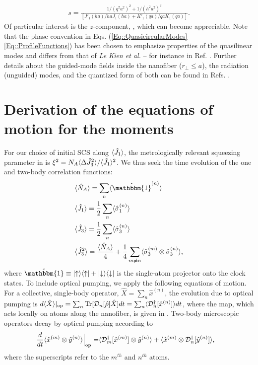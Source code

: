 \documentclass[preprint, aps,pra,onecolumn]{revtex4-1} %
\newcommand{\jx}{\hat{J}_1}
\begin{document}
\begin{appendix}
	\begin{align}
		s = \frac{1/(q^2 a^2)^{2} + 1/(h^2 a^2)^{2}}{[J'_1(ha)/haJ_1(ha) + K'_1(qa)/qaK_1(qa)]}.
	\end{align}  
Of particular interest is the $z$-component, , which can become appreciable.  Note that the phase convention in Eqs. (\ref{Eq::QuasicircularModes}-\ref{Eq::ProfileFunctions}) has been chosen to emphasize properties of the quasilinear modes and differs from that of \emph{Le Kien et al.} -- for instance in Ref. \cite{le_kien_propagation_2014}.  
Further details about the guided-mode fields inside the nanofiber ($r_\perp\leq a$), the radiation (unguided) modes, and the quantized form of both can be found in Refs. \cite{sondergaard_general_2001, tong_single-mode_2004, kien_field_2004, le_kien_spontaneous_2005, vetsch_eugen_optical_2010}.


\section{Derivation of the equations of motion for the moments} \label{Appendix::OpticalPumping}	

For our choice of initial SCS along $\expt{\jx}$, the metrologically relevant squeezing parameter in  is $\xi^2 = N_A \langle{\Delta \hat{J}_3^2}\rangle/\langle{\hat{J}_1}\rangle^2$.  
We thus seek the time evolution of the one and two-body correlation functions:
\begin{align}
&\expt{\hat{N}_A} = \sum_n \expt{\hat{\mathbbm{1}}^{(n)}} \\
&\expt{\hat{J}_1} = \frac{1}{2} \sum_n \expt{\hat{\sigma}_1^{(n)}} \\
&\expt{\hat{J}_3} = \frac{1}{2} \sum_n \expt{\hat{\sigma}_3^{(n)}} \\
&\expt{\hat{J}_3^2} = \frac{\expt{\hat{N}_A}}{4} +\frac{1}{4} \sum_{m \neq n} \expt{\hat{\sigma}_3^{(m)}\otimes \hat{\sigma}_3^{(n)}}, 
\end{align}
where $\hat{\mathbbm{1}} \equiv \op{\uparrow}{\uparrow} + \op{\downarrow}{\downarrow}$ is the single-atom projector onto the clock states. 
To include optical pumping, we apply the following equations of motion. For a collective, single-body operator, $\hat{X} = \sum_n \hat{x}^{(n)}$, the evolution due to optical pumping is $d\langle{ \hat{X}}\rangle|_{\rm op} = \sum_n \mbox{Tr} [\mathcal{D}_n[\hat{\rho}]\hat{X} ]dt = \sum_n \langle{\mathcal{D}_n^\dagger[\hat{x}^{(n)}]}\rangle dt$, where the map, which acts locally on atoms along the nanofiber, is given in .  
Two-body microscopic operators decay by optical pumping according to \cite{baragiola_three-dimensional_2014}
	\begin{align} \label{Eq::TwoBodyDecay}
		\frac{d}{dt} \langle{ \hat{x}^{(m)} \otimes \hat{y}^{(n)} }\rangle \Big|_{\rm op}= &\langle{ \mathcal{D}_m^\dagger[ \hat{x}^{(m)}] \otimes \hat{y}^{(n)} }\rangle + \langle{ \hat{x}^{(m)}\otimes \mathcal{D}_n^\dagger[ \hat{y}^{(n)}] }\rangle,
	\end{align}
where the superscripts refer to the $m^{th}$ and $n^{th}$ atoms. 


\end{appendix}
\end{document}
